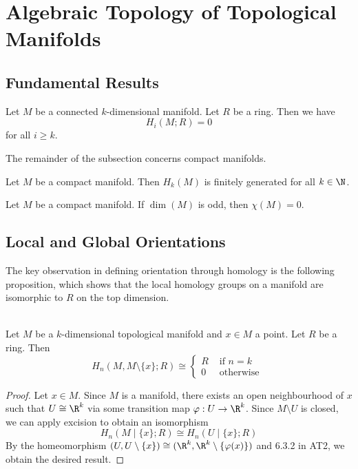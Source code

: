 \documentclass[a4paper]{article}
\begin{document}
\pagebreak
\section{Algebraic Topology of Topological Manifolds}
\subsection{Fundamental Results}
\begin{lmm}{}{} Let $M$ be a connected $k$-dimensional manifold. Let $R$ be a ring. Then we have $$H_i(M;R)=0$$ for all $i\geq k$. 
\end{lmm}

The remainder of the subsection concerns compact manifolds. 

\begin{prp}{}{} Let $M$ be a compact manifold. Then $H_k(M)$ is finitely generated for all $k\in\N$. 
\end{prp}

\begin{prp}{}{} Let $M$ be a compact manifold. If $\dim(M)$ is odd, then $\chi(M)=0$. 
\end{prp}

\subsection{Local and Global Orientations}
The key observation in defining orientation through homology is the following proposition, which shows that the local homology groups on a manifold are isomorphic to $R$ on the top dimension. 

\begin{prp}{}{}\\
Let $M$ be a $k$-dimensional topological manifold and $x\in M$ a point. Let $R$ be a ring. Then $$H_n(M,M\setminus\{x\};R)\cong\begin{cases}
R & \text{ if } n=k\\
0 & \text{ otherwise }
\end{cases}$$ 
\begin{proof}
Let $x\in M$. Since $M$ is a manifold, there exists an open neighbourhood of $x$ such that $U\cong\R^k$ via some transition map $\varphi:U\to\R^k$. Since $M\setminus U$ is closed, we can apply excision to obtain an isomorphism $$H_n(M\;|\;\{x\};R)\cong H_n(U\;|\;\{x\};R)$$ By the homeomorphism $(U,U\setminus\{x\})\cong(\R^k,\R^k\setminus\{\varphi(x)\})$ and 6.3.2 in AT2, we obtain the desired result. 
\end{proof}
\end{prp}
\end{document}

